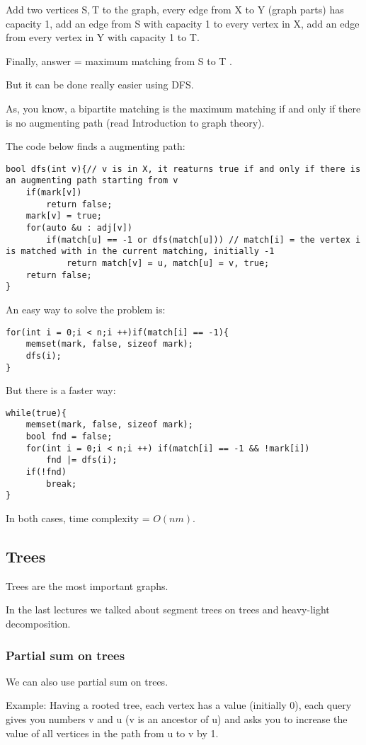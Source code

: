 Add two vertices S, T to the graph, every edge from X to Y (graph parts) has capacity 1, add an edge from S with capacity 1 to every vertex in X, add an edge from every vertex in Y with capacity 1 to T.

Finally, answer = maximum matching from S to T .

But it can be done really easier using DFS.

As, you know, a bipartite matching is the maximum matching if and only if there is no augmenting path (read Introduction to graph theory).

The code below finds a augmenting path:
\begin{verbatim}
bool dfs(int v){// v is in X, it reaturns true if and only if there is an augmenting path starting from v
	if(mark[v])
		return false;
	mark[v] = true;
	for(auto &u : adj[v])
		if(match[u] == -1 or dfs(match[u])) // match[i] = the vertex i is matched with in the current matching, initially -1
			return match[v] = u, match[u] = v, true;
	return false;
}
\end{verbatim}
An easy way to solve the problem is:
\begin{verbatim}
for(int i = 0;i < n;i ++)if(match[i] == -1){
	memset(mark, false, sizeof mark);
	dfs(i);
}
\end{verbatim}
But there is a faster way:
\begin{verbatim}
while(true){
	memset(mark, false, sizeof mark);
	bool fnd = false;
	for(int i = 0;i < n;i ++) if(match[i] == -1 && !mark[i])
		fnd |= dfs(i);
	if(!fnd)
		break;
}
\end{verbatim}
In both cases, time complexity = $O(nm)$.

\subsection{Trees}
Trees are the most important graphs.

In the last lectures we talked about segment trees on trees and heavy-light decomposition.

\subsubsection{Partial sum on trees}
We can also use partial sum on trees.

Example: Having a rooted tree, each vertex has a value (initially 0), each query gives you numbers v and u (v is an ancestor of u) and asks you to increase the value of all vertices in the path from u to v by 1.

